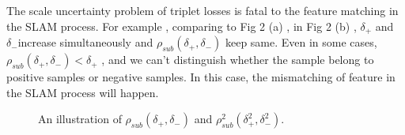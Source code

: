 \documentclass[letterpaper, 10 pt, conference]{ieeeconf}  %
\begin{document}
The scale uncertainty problem of triplet losses is fatal to the feature matching in the SLAM process.  For example ,  comparing to  Fig 2 (a)  , in  Fig 2 (b) , $\delta _{+}$ and $\delta _{-}$increase simultaneously and $\rho _{sub}\left ( \delta _{+} , \delta _{-} \right )$ keep same. Even  in some cases, $\rho _{sub}\left ( \delta _{+} , \delta _{-} \right ) < \delta _{+}$ , and we can't distinguish whether the sample belong to positive samples or negative samples. In this case, the mismatching  of feature  in the SLAM process will happen.

\begin{figure}[htbp]
\centering
{}%
%
\centering
\caption{ An illustration of   $\rho _{sub}\left ( \delta _{+} , \delta _{-} \right ) $ and $\rho _{sub}^{2}\left ( \delta _{+}^{2} , \delta _{-}^{2} \right ) $. }
\end{figure}
\end{document}
